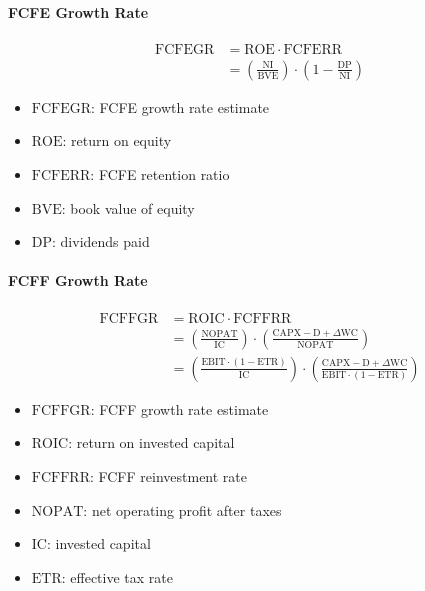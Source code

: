 \paragraph{FCFE Growth Rate}

$$
\begin{aligned}
\text{FCFEGR} &= \text{ROE} \cdot \text{FCFERR} \\
&= \left( \frac{\text{NI}}{\text{BVE}} \right) \cdot \left( 1 - \frac{\text{DP}}{\text{NI}} \right)
\end{aligned}
$$

\begin{itemize}
  \item[] $\text{FCFEGR}$: FCFE growth rate estimate
  \item[] $\text{ROE}$: return on equity
  \item[] $\text{FCFERR}$: FCFE retention ratio
  \item[] $\text{BVE}$: book value of equity
  \item[] $\text{DP}$: dividends paid
\end{itemize}

\paragraph{FCFF Growth Rate}

$$
\begin{aligned}
\text{FCFFGR} &= \text{ROIC} \cdot \text{FCFFRR} \\
&= \left( \frac{\text{NOPAT}}{\text{IC}} \right) \cdot \left( \frac{\text{CAPX} - \text{D} + \Delta \text{WC}}{\text{NOPAT}} \right) \\
&= \left( \frac{\text{EBIT} \cdot (1 - \text{ETR})}{\text{IC}} \right) \cdot \left( \frac{\text{CAPX} - \text{D} + \Delta \text{WC}}{\text{EBIT} \cdot (1 - \text{ETR})} \right)
\end{aligned}
$$

\begin{itemize}
  \item[] $\text{FCFFGR}$: FCFF growth rate estimate
  \item[] $\text{ROIC}$: return on invested capital
  \item[] $\text{FCFFRR}$: FCFF reinvestment rate
  \item[] $\text{NOPAT}$: net operating profit after taxes
  \item[] $\text{IC}$: invested capital
  \item[] $\text{ETR}$: effective tax rate
\end{itemize}


